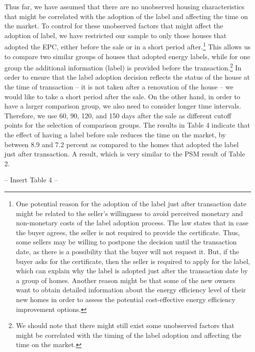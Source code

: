 \documentclass[12pt]{article}
\begin{document}
Thus far, we have assumed that there are no unobserved housing characteristics that might be correlated with the adoption of the label and affecting the time on the market. To control for these unobserved factors that might affect the adoption of label, we have restricted our sample to only those houses that adopted the EPC, either before the sale or in a short period after.\footnote{One potential reason for the adoption of the label just after transaction date might be related to the seller’s willingness to avoid perceived monetary and non-monetary costs of the label adoption process. The law states that in case the buyer agrees, the seller is not required to provide the certificate. Thus, some sellers may be willing to postpone the decision until the transaction date, as there is a possibility that the buyer will not request it. But, if the buyer asks for the certificate, then the seller is required to apply for the label, which can explain why the label is adopted just after the transaction date by a group of homes. Another reason might be that some of the new owners want to obtain detailed information about the energy efficiency level of their new homes in order to assess the potential cost-effective energy efficiency improvement options.} This allows us to compare two similar groups of houses that adopted energy labels, while for one group the additional information (label) is provided before the transaction.\footnote{We should note that there might still exist some unobserved factors that might be correlated with the timing of the label adoption and affecting the time on the market.} In order to ensure that the label adoption decision reflects the status of the house at the time of transaction – it is not taken after a renovation of the house – we would like to take a short period after the sale. On the other hand, in order to have a larger comparison group, we also need to consider longer time intervals. Therefore, we use 60, 90, 120, and 150 days after the sale as different cutoff points for the selection of comparison groups. The results in Table 4 indicate that the effect of having a label before sale reduces the time on the market, by between 8.9 and 7.2 percent as compared to the homes that adopted the label just after transaction. A result, which is very similar to the PSM result of Table 2. 

\begin{center}
-- Insert Table 4 --
\end{center}
\end{document}
